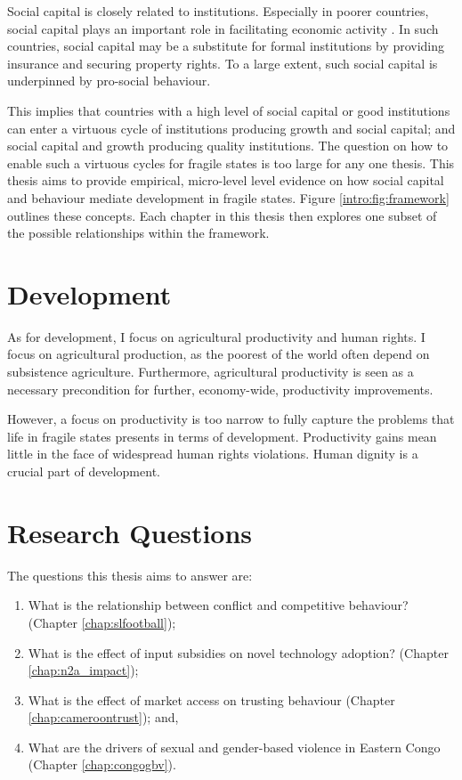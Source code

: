 %
Social capital is closely related to institutions.  Especially in poorer countries, social capital plays an important role in facilitating economic activity \citep{Knack1997}. In such countries, social capital may be a substitute for formal institutions by providing insurance and securing property rights. To a large extent, such social capital is underpinned by pro-social behaviour. 

This implies that countries with a high level of social capital or good institutions can enter a virtuous cycle of institutions producing growth and social capital; and social capital and growth producing quality institutions. The question on how to enable such a virtuous cycles for fragile states is too large for any one thesis. This thesis aims to provide empirical, micro-level level evidence on how social capital and behaviour mediate development in fragile states. Figure \ref{intro:fig:framework} outlines these concepts. Each chapter in this thesis then explores one subset of the possible relationships within the framework.



\section{Development}
As for development, I focus on agricultural productivity and human rights. I focus on agricultural production, as the poorest of the world often depend on subsistence agriculture. Furthermore, agricultural productivity is seen as a necessary precondition for further, economy-wide, productivity improvements.  

However, a focus on productivity is too narrow to fully capture the problems that life in fragile states presents in terms of development. Productivity gains mean little in the face of widespread human rights violations. Human dignity is a crucial part of development.


\section{Research Questions}
The questions this thesis aims to answer are:
\begin{enumerate}
	\item What is the relationship between conflict and competitive behaviour? (Chapter \ref{chap:slfootball});
	\item What is the effect of input subsidies on novel technology adoption? (Chapter \ref{chap:n2a_impact});
	\item What is the effect of market access on trusting behaviour (Chapter \ref{chap:cameroontrust}); and,
	\item What are the drivers of sexual and gender-based violence in Eastern Congo (Chapter \ref{chap:congogbv}).
\end{enumerate}

